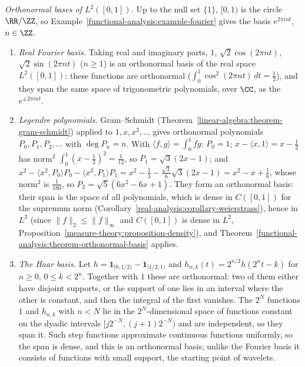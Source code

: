 \begin{example}\label{functional-analysis:example-bases-l2}
\emph{Orthonormal bases of $L^2([0, 1])$.} Up to the null set $\{1\}$, $[0, 1)$ is the circle $\RR/\ZZ$, so Example~\ref{functional-analysis:example-fourier} gives the basis $e^{2\pi int}$, $n \in \ZZ$.
\begin{enumerate}
\item \emph{Real Fourier basis.} Taking real and imaginary parts, $1$, $\sqrt2\cos(2\pi nt)$, $\sqrt2\sin(2\pi nt)$ ($n \geq 1$) is an orthonormal basis of the real space $L^2([0, 1])$: these functions are
orthonormal ($\int_0^1\cos^2(2\pi nt)\,dt = \frac12$), and they span the same space of trigonometric polynomials, over $\CC$, as the $e^{\pm2\pi int}$.
\item \emph{Legendre polynomials.} Gram--Schmidt (Theorem~\ref{linear-algebra:theorem-gram-schmidt}) applied to $1, x, x^2, \ldots$ gives orthonormal polynomials $P_0, P_1, P_2, \ldots$ with
$\deg P_n = n$. With $\langle f, g\rangle = \int_0^1fg$: $P_0 = 1$; $x - \langle x, 1\rangle = x - \frac12$ has norm$^2$ $\int_0^1(x - \frac12)^2 = \frac1{12}$, so $P_1 = \sqrt3(2x - 1)$; and
$x^2 - \langle x^2, P_0\rangle P_0 - \langle x^2, P_1\rangle P_1 = x^2 - \frac13 - \frac{\sqrt3}{6}\sqrt3(2x - 1) = x^2 - x + \frac16$, whose norm$^2$ is $\frac1{180}$, so $P_2 = \sqrt5(6x^2 - 6x + 1)$.
They form an orthonormal basis: their span is the space of all polynomials, which is dense in $C([0, 1])$ for the supremum norm (Corollary~\ref{real-analysis:corollary-weierstrass}), hence in
$L^2$ (since $\|f\|_2 \leq \|f\|_\infty$ and $C([0, 1])$ is dense in $L^2$, Proposition~\ref{measure-theory:proposition-density}), and Theorem~\ref{functional-analysis:theorem-orthonormal-basis} applies.
\item \emph{The Haar basis.} Let $h = \mathbf{1}_{[0, 1/2)} - \mathbf{1}_{[1/2, 1)}$ and $h_{n,k}(t) = 2^{n/2}h(2^nt - k)$ for $n \geq 0$, $0 \leq k < 2^n$. Together with $1$ these are orthonormal: two of them
either have disjoint supports, or the support of one lies in an interval where the other is constant, and then the integral of the first vanishes. The $2^N$ functions $1$ and $h_{n,k}$ with $n < N$ lie
in the $2^N$-dimensional space of functions constant on the dyadic intervals $[j2^{-N}, (j + 1)2^{-N})$ and are independent, so they span it. Such step functions approximate continuous functions
uniformly, so the span is dense, and this is an orthonormal basis; unlike the Fourier basis it consists of functions with small support, the starting point of wavelets.
\end{enumerate}
\end{example}

